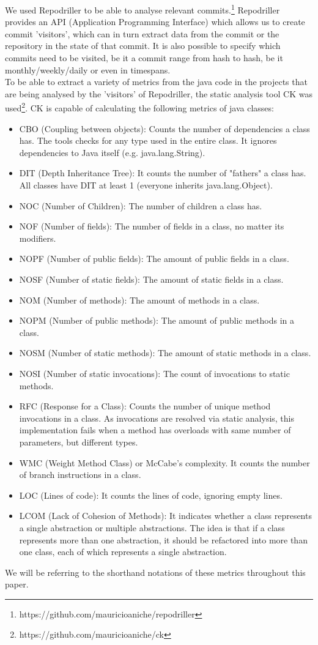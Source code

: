 We used Repodriller to be able to analyse relevant commits.\footnote{https://github.com/mauricioaniche/repodriller}
Repodriller provides an API (Application Programming Interface) which allows us to create commit 'visitors', which can in turn extract data from the commit or the repository in the state of that commit. It is also possible to specify which commits need to be visited, be it a commit range from hash to hash, be it monthly/weekly/daily or even in timespans.\\
To be able to extract a variety of metrics from the java code in the projects that are being analysed by the 'visitors' of Repodriller, the static analysis tool CK was used\footnote{https://github.com/mauricioaniche/ck}. CK is capable of calculating the following metrics of java classes:

\begin{itemize}
\item CBO (Coupling between objects): Counts the number of dependencies a class has. The tools checks for any type used in the entire class. It ignores dependencies to Java itself (e.g. java.lang.String).
\item DIT (Depth Inheritance Tree): It counts the number of "fathers" a class has. All classes have DIT at least 1 (everyone inherits java.lang.Object).
\item NOC (Number of Children): The number of children a class has.
\item NOF (Number of fields): The number of fields in a class, no matter its modifiers.
\item NOPF (Number of public fields): The amount of public fields in a class.
\item NOSF (Number of static fields): The amount of static fields in a class.
\item NOM (Number of methods): The amount of methods in a class.
\item NOPM (Number of public methods): The amount of public methods in a class.
\item NOSM (Number of static methods): The amount of static methods in a class.
\item NOSI (Number of static invocations): The count of invocations to static methods.
\item RFC (Response for a Class): Counts the number of unique method invocations in a class. As invocations are resolved via static analysis, this implementation fails when a method has overloads with same number of parameters, but different types.
\item WMC (Weight Method Class) or McCabe's complexity. It counts the number of branch instructions in a class.
\item LOC (Lines of code): It counts the lines of code, ignoring empty lines.
\item LCOM (Lack of Cohesion of Methods): It indicates whether a class represents a single abstraction or multiple abstractions. The idea is that if a class represents more than one abstraction, it should be refactored into more than one class, each of which represents a single abstraction.
\end{itemize}
We will be referring to the shorthand notations of these metrics throughout this paper.


